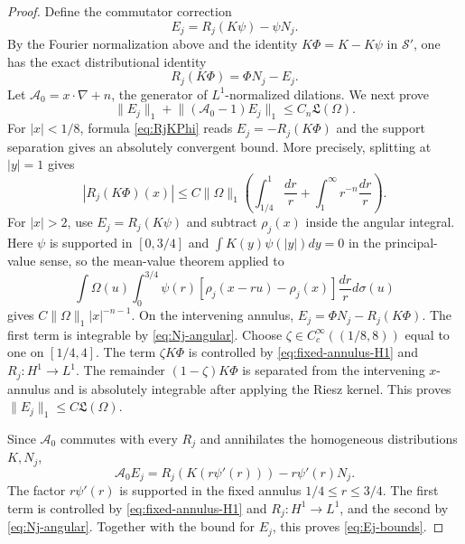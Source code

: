 \documentclass[11pt]{article}
\numberwithin{equation}{section}
\theoremstyle{remark}
\theoremstyle{definition}
\newcommand{\norm}[1]{\lVert #1\rVert}
\begin{document}
\begin{proof}
Define the commutator correction
\begin{equation}\label{eq:Ej-def}
 E_j=R_j(K\psi)-\psi N_j.
\end{equation}
By the Fourier normalization above and the identity $K\Phi=K-K\psi$
in $\mathcal S'$, one has the exact distributional identity
\begin{equation}\label{eq:RjKPhi}
 R_j(K\Phi)=\Phi N_j-E_j.
\end{equation}
Let $\mathcal A_0=x\cdot\nabla+n$, the generator of $L^1$-normalized
dilations.  We next prove
\begin{equation}\label{eq:Ej-bounds}
 \norm{E_j}_1+\norm{(\mathcal A_0-1)E_j}_1
 \le C_n\mathfrak L(\Omega).
\end{equation}
For $|x|<1/8$, formula \eqref{eq:RjKPhi} reads
$E_j=-R_j(K\Phi)$ and the support separation gives an absolutely convergent
bound.  More precisely, splitting at $|y|=1$ gives
\[
 |R_j(K\Phi)(x)|
 \le C\|\Omega\|_1\left(\int_{1/4}^1\frac{dr}{r}
       +\int_1^\infty r^{-n}\frac{dr}{r}\right).
\]
For $|x|>2$, use $E_j=R_j(K\psi)$ and subtract $\rho_j(x)$ inside the
angular integral.  Here $\psi$ is supported in $[0,3/4]$ and
$\int K(y)\psi(|y|)dy=0$ in the principal-value sense, so the mean-value
theorem applied to
\[
 \int\Omega(u)\int_0^{3/4}\psi(r)
 [\rho_j(x-ru)-\rho_j(x)]\frac{dr}{r}d\sigma(u)
\]
gives $C\norm\Omega_1|x|^{-n-1}$.  On the intervening annulus,
$E_j=\Phi N_j-R_j(K\Phi)$.  The first term is integrable by
\eqref{eq:Nj-angular}.  Choose $\zeta\in C_c^\infty((1/8,8))$ equal to
one on $[1/4,4]$.  The term $\zeta K\Phi$ is controlled by
\eqref{eq:fixed-annulus-H1} and $R_j:H^1\to L^1$.  The remainder
$(1-\zeta)K\Phi$ is separated from the intervening $x$-annulus and is
absolutely integrable after applying the Riesz kernel.  This proves
$\norm{E_j}_1\le C\mathfrak L(\Omega)$.

Since $\mathcal A_0$ commutes with every $R_j$ and annihilates the
homogeneous distributions $K,N_j$,
\[
 \mathcal A_0E_j=R_j(K(r\psi'(r)))-r\psi'(r)N_j.
\]
The factor $r\psi'(r)$ is supported in the fixed annulus
$1/4\le r\le3/4$.  The first term is controlled by
\eqref{eq:fixed-annulus-H1} and $R_j:H^1\to L^1$, and the second by
\eqref{eq:Nj-angular}.  Together with the bound for $E_j$, this proves
\eqref{eq:Ej-bounds}.


\end{proof}
\end{document}
